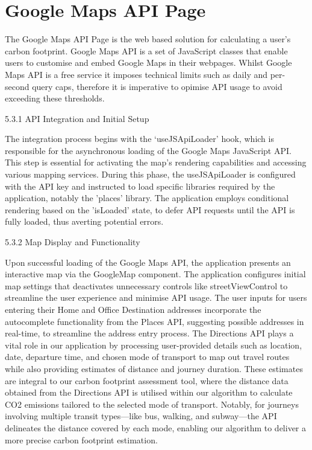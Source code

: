 \documentclass{l4proj}
\begin{document}
\section{Google Maps API Page}

The Google Maps API Page is the web based solution for calculating a user’s carbon footprint. Google Maps API is a set of JavaScript classes that enable users to customise and embed Google Maps in their webpages. Whilst Google Maps API is a free service it imposes technical limits such as daily and per-second query caps, therefore it is imperative to opimise API usage to avoid exceeding these thresholds.

5.3.1 API Integration and Initial Setup

The integration process begins with the ‘useJSApiLoader’ hook, which is responsible for the asynchronous loading of the Google Maps JavaScript API. This step is essential for activating the map's rendering capabilities and accessing various mapping services. During this phase, the useJSApiLoader is configured with the API key and instructed to load specific libraries required by the application, notably the 'places' library. The application employs conditional rendering based on the 'isLoaded' state, to defer API requests until the API is fully loaded, thus averting potential errors.
 
5.3.2 Map Display and Functionality

Upon successful loading of the Google Maps API, the application presents an interactive map via the GoogleMap component. The application configures initial map settings that deactivates unnecessary controls like streetViewControl to streamline the user experience and minimise API usage. The user inputs for users entering their Home and Office Destination addresses incorporate the autocomplete functionality from the Places API, suggesting possible addresses in real-time, to streamline the address entry process. The Directions API plays a vital role in our application by processing user-provided details such as location, date, departure time, and chosen mode of transport to map out travel routes while also providing estimates of distance and journey duration. These estimates are integral to our carbon footprint assessment tool, where the distance data obtained from the Directions API is utilised within our algorithm to calculate CO2 emissions tailored to the selected mode of transport. Notably, for journeys involving multiple transit types—like bus, walking, and subway—the API delineates the distance covered by each mode, enabling our algorithm to deliver a more precise carbon footprint estimation.
\end{document}
